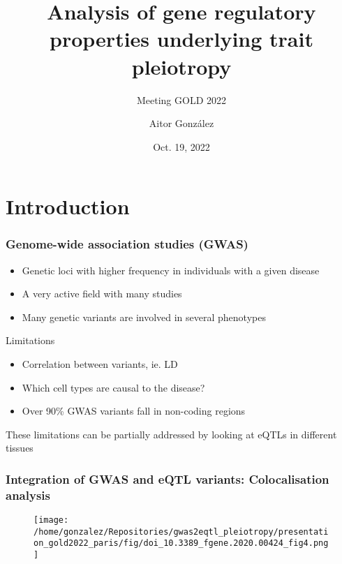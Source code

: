 \documentclass{beamer}
\title{Analysis of gene regulatory properties underlying trait pleiotropy}
\subtitle{Meeting GOLD 2022}
\author{Aitor Gonz\'alez}
\institute{Aix Marseille Univ, INSERM, TAGC}
\date{Oct. 19, 2022}
\begin{document}
\begin{frame}

\titlepage

\end{frame}


\section{Introduction} %

\begin{frame}
\frametitle{Genome-wide association studies (GWAS)}

\begin{itemize}
\item Genetic loci with higher frequency in individuals with a given disease
\item A very active field with many studies
\item Many genetic variants are involved in several phenotypes
\end{itemize}
%
\vfill
%
Limitations
%
\vfill
%
\begin{itemize}
\item Correlation between variants, ie. LD
\item Which cell types are causal to the disease?
\item Over 90\% GWAS variants fall in non-coding regions
\end{itemize}
%
\vfill
%
These limitations can be partially addressed by looking at eQTLs in different tissues

\end{frame}

\begin{frame}
\frametitle{Integration of GWAS and eQTL variants:  Colocalisation analysis}

\begin{figure}[!]
\texttt{[image: /home/gonzalez/Repositories/gwas2eqtl\_pleiotropy/presentation\_gold2022\_paris/fig/doi\_10.3389\_fgene.2020.00424\_fig4.png]}
\end{figure}

\let\thefootnote\relax{}
\end{frame}
\end{document}
